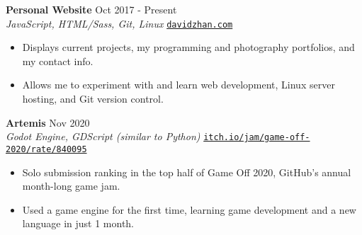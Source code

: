 \documentclass[letterpaper,10pt]{extarticle}
\begin{document}
\noindent
\textbf{Personal Website} \hfill Oct 2017 - Present\\ %
\textit{JavaScript, HTML/Sass, Git, Linux} \hfill \texttt{\href{https://davidzhan.com}{davidzhan.com}} %
\begin{itemize}
    \item Displays current projects, my programming and photography portfolios, and my contact info.
    \item Allows me to experiment with and learn web development, Linux server hosting, and Git version control. %
\end{itemize}

\noindent
\textbf{Artemis} \hfill Nov 2020\\ %
\textit{Godot Engine, GDScript (similar to Python)} \hfill \texttt{\href{https://itch.io/jam/game-off-2020/rate/840095}{itch.io/jam/game-off-2020/rate/840095}}
\begin{itemize}
    \item Solo submission ranking in the top half of Game Off 2020, GitHub's annual month-long game jam.
    \item Used a game engine for the first time, learning game development and a new language in just 1 month.
\end{itemize}

\end{document}
